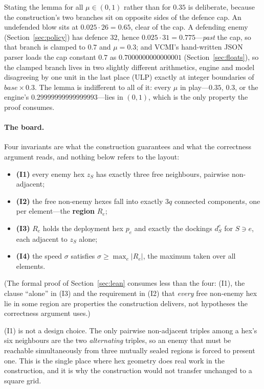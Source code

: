 \documentclass[11pt,a4paper]{article}
\theoremstyle{plain}
\theoremstyle{definition}
\theoremstyle{plain}
\theoremstyle{definition}
\theoremstyle{remark}
\begin{document}
Stating the lemma for all $\mu\in(0,1)$ rather than for $0.35$ is deliberate, because the
construction's two branches sit on opposite sides of the defence cap. An undefended blow sits
at $0.025\cdot 26=0.65$, clear of the cap. A defending enemy (Section~\ref{sec:policy}) has
defence 32, hence $0.025\cdot 31=0.775$---\emph{past} the cap, so that branch is clamped to
$0.7$ and $\mu=0.3$; and VCMI's hand-written JSON parser loads the cap constant $0.7$ as
$0.7000000000000001$ (Section~\ref{sec:floats}), so the clamped branch lives in two slightly
different arithmetics, engine and model disagreeing by one unit in the last place (ULP)
exactly at integer boundaries
of $\mathit{base}\times 0.3$. The lemma is indifferent to all of it: every $\mu$ in play---$0.35$,
$0.3$, or the engine's $0.29999999999999993$---lies in $(0,1)$, which is the only property the
proof consumes.

\paragraph{The board.} Four invariants are what the construction guarantees and what the
correctness argument reads, and nothing below
refers to the layout:

\begin{itemize}
\item \textbf{(I1)} every enemy hex $z_S$ has exactly three free neighbours, pairwise
  non-adjacent;
\item \textbf{(I2)} the free non-enemy hexes fall into exactly $3q$ connected components, one
  per element---the \textbf{region} $R_e$;
\item \textbf{(I3)} $R_e$ holds the deployment hex $p_e$ and exactly the dockings $d_S^e$ for
  $S\ni e$, each adjacent to $z_S$ alone;
\item \textbf{(I4)} the speed $\sigma$ satisfies $\sigma\ge\max_e|R_e|$, the maximum
  taken over all elements.
\end{itemize}

\noindent(The formal proof of Section~\ref{sec:lean} consumes less than the four: (I1), the
clause ``alone'' in (I3) and the requirement in (I2) that \emph{every} free non-enemy hex lie
in some region are properties the construction delivers, not hypotheses the correctness
argument uses.)

(I1) is not a design choice. The only pairwise non-adjacent triples among a hex's six
neighbours are the two \emph{alternating} triples, so an enemy that must be reachable
simultaneously from three mutually sealed regions is forced to present one. This is the single place where hex
geometry does real work in the construction, and it is why the construction would not
transfer unchanged to a square grid.
\end{document}
